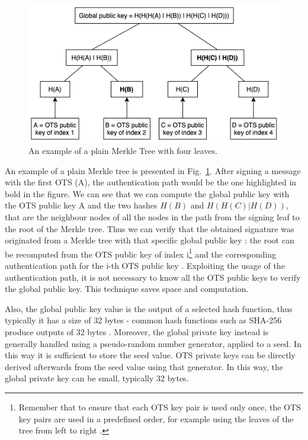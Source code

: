 \documentclass[a4paper,12pt]{article}
\def\myfig#1{Fig.~#1\xspace}
\begin{document}
\begin{figure}
\centerline{\includegraphics[scale=0.75]{img/merkle.png}}
\caption{An example of a plain Merkle Tree with four leaves.}
\label{fig:merkle}
\end{figure}

An example of a plain Merkle tree is presented in \myfig{\ref{fig:merkle}}.
After signing a message with the first OTS (A), the authentication path would be the one highlighted in bold in the figure.
We can see that we can compute the global public key with the OTS public key A and the two hashes $H(B)$ and $H(H(C)|H(D))$, that are the neighbour nodes of all the nodes in the path from the signing leaf to the root of the Merkle tree. Thus we can verify that the obtained signature was originated from a Merkle tree with that specific global public key \cite{5_postquantum_signature_usecase}:
the root can be recomputed from the OTS public key of index i\footnote{Remember that to ensure that each OTS key pair is used only once, the OTS key pairs are used in a predefined order, for example using the leaves of the tree from left to right \cite{1_sphincspaper}.}
and the corresponding authentication path for the i-th OTS public key \cite{13_faultattacks}.
Exploiting the usage of the authentication path, it is not necessary to know all the OTS public keys to verify the global public key. This technique saves space and computation.

Also, the global public key value is the output of a selected hash function, thus typically it has a size of 32 bytes - common hash functions such as SHA-256 produce outputs of 32 bytes \cite{53_hbs}.
Moreover, the global private key instead is generally handled using a pseudo-random number generator, applied to a seed. In this way it is sufficient to store the seed value. OTS private keys can be directly derived afterwards from the seed value using that generator. In this way, the global private key can be small, typically 32 bytes.
\end{document}
